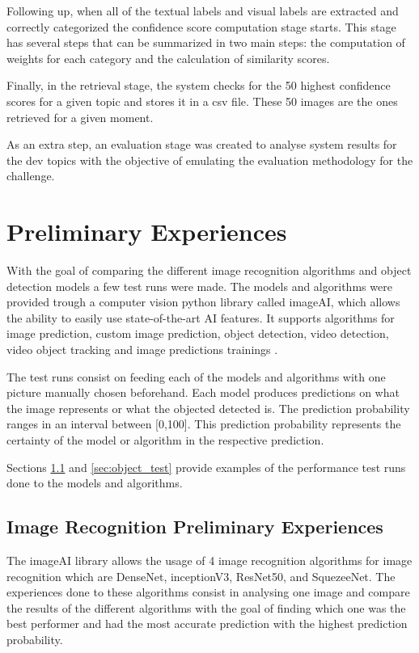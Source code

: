 Following up, when all of the textual labels and visual labels are extracted and correctly categorized the confidence score computation stage starts. This stage has several steps that can be summarized in two main steps: the computation of weights for each category and the calculation of similarity scores.

Finally, in the retrieval stage, the system checks for the 50 highest confidence scores for a given topic and stores it in a csv file. These 50 images are the ones retrieved for a given moment.

As an extra step, an evaluation stage was created to analyse system results for the dev topics with the objective of emulating the evaluation methodology for the challenge.


  
  \section{Preliminary Experiences}
  \label{sec:testruns}

   With the goal of comparing the different image recognition algorithms and object detection models a few test runs were made. The models and algorithms were provided trough a computer vision python library called imageAI, which allows the ability to easily use state-of-the-art AI features. It supports algorithms for image prediction, custom image prediction, object detection, video detection, video object tracking and image predictions trainings \cite{ImageAI}.

  The test runs consist on feeding each of the models and algorithms with one picture manually chosen beforehand. Each model produces predictions on what the image represents or what the objected detected is. The prediction probability ranges in an interval between [0,100]. This prediction probability represents the certainty of the model or algorithm in the respective prediction.


  \par Sections \ref{sec:image_test} and \ref{sec:object_test} provide examples of the performance test runs done to the models and algorithms.

  \subsection{Image Recognition Preliminary Experiences}
  \label{sec:image_test}


  The imageAI library allows the usage of 4 image recognition algorithms for image recognition which are DenseNet, inceptionV3, ResNet50, and SquezeeNet. The experiences done to these algorithms consist in analysing one image and compare the results of the different algorithms with the goal of finding which one was the best performer and had the most accurate prediction with the highest prediction probability.
 
